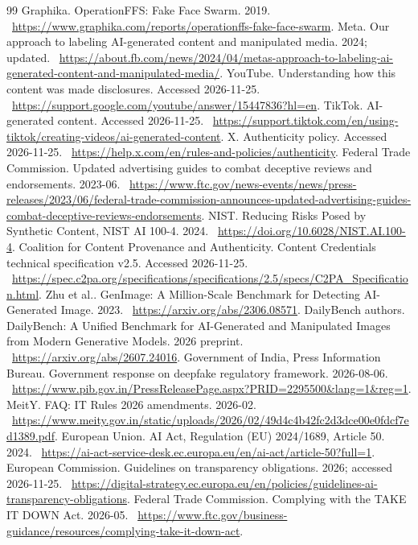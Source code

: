 \documentclass[10pt,a4paper]{article}
\begin{document}
\begin{thebibliography}{99}
 Graphika. OperationFFS: Fake Face Swarm. 2019. \ \url{https://www.graphika.com/reports/operationffs-fake-face-swarm}.
 Meta. Our approach to labeling AI-generated content and manipulated media. 2024; updated. \ \url{https://about.fb.com/news/2024/04/metas-approach-to-labeling-ai-generated-content-and-manipulated-media/}.
 YouTube. Understanding how this content was made disclosures. Accessed 2026-11-25. \ \url{https://support.google.com/youtube/answer/15447836?hl=en}.
 TikTok. AI-generated content. Accessed 2026-11-25. \ \url{https://support.tiktok.com/en/using-tiktok/creating-videos/ai-generated-content}.
 X. Authenticity policy. Accessed 2026-11-25. \ \url{https://help.x.com/en/rules-and-policies/authenticity}.
 Federal Trade Commission. Updated advertising guides to combat deceptive reviews and endorsements. 2023-06. \ \url{https://www.ftc.gov/news-events/news/press-releases/2023/06/federal-trade-commission-announces-updated-advertising-guides-combat-deceptive-reviews-endorsements}.
 NIST. Reducing Risks Posed by Synthetic Content, NIST AI 100-4. 2024. \ \url{https://doi.org/10.6028/NIST.AI.100-4}.
 Coalition for Content Provenance and Authenticity. Content Credentials technical specification v2.5. Accessed 2026-11-25. \ \url{https://spec.c2pa.org/specifications/specifications/2.5/specs/C2PA_Specification.html}.
 Zhu et al.. GenImage: A Million-Scale Benchmark for Detecting AI-Generated Image. 2023. \ \url{https://arxiv.org/abs/2306.08571}.
 DailyBench authors. DailyBench: A Unified Benchmark for AI-Generated and Manipulated Images from Modern Generative Models. 2026 preprint. \ \url{https://arxiv.org/abs/2607.24016}.
 Government of India, Press Information Bureau. Government response on deepfake regulatory framework. 2026-08-06. \ \url{https://www.pib.gov.in/PressReleasePage.aspx?PRID=2295500&lang=1&reg=1}.
 MeitY. FAQ: IT Rules 2026 amendments. 2026-02. \ \url{https://www.meity.gov.in/static/uploads/2026/02/49d4c4b42fc2d3dce00e0fdcf7ed1389.pdf}.
 European Union. AI Act, Regulation (EU) 2024/1689, Article 50. 2024. \ \url{https://ai-act-service-desk.ec.europa.eu/en/ai-act/article-50?full=1}.
 European Commission. Guidelines on transparency obligations. 2026; accessed 2026-11-25. \ \url{https://digital-strategy.ec.europa.eu/en/policies/guidelines-ai-transparency-obligations}.
 Federal Trade Commission. Complying with the TAKE IT DOWN Act. 2026-05. \ \url{https://www.ftc.gov/business-guidance/resources/complying-take-it-down-act}.

\end{thebibliography}
\end{document}
